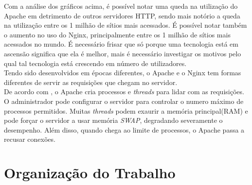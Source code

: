 Com a análise dos gráficos acima, é possível notar uma queda na utilização do Apache em detrimento de outros servidores HTTP, sendo mais notório a queda na utilização entre os 1 milhão de sítios mais acessados. É possível notar também o aumento no uso do Nginx, principalmente entre os 1 milhão de sítios mais acessados no mundo. É necessário frisar que só porque uma tecnologia está em ascensão significa que ela é melhor, mais é necessário investigar os motivos pelo qual tal tecnologia está crescendo em número de utilizadores.\\
Tendo sido desenvolvidos em épocas diferentes, o Apache e o Nginx tem formas diferentes de servir as requisições que chegam no servidor.\\
De acordo com , o Apache cria processos e \textit{threads} para lidar com as requisições. O administrador pode configurar o servidor para controlar o numero máximo de processos permitidos. Muitas \textit{threads} podem exaurir a memória principal(RAM) e pode forçar o servidor a usar memória \textit{SWAP}, degradando severamente o desempenho. Além disso, quando chega ao limite de processos, o Apache passa a recusar conexões.

\section{Organização do Trabalho}

